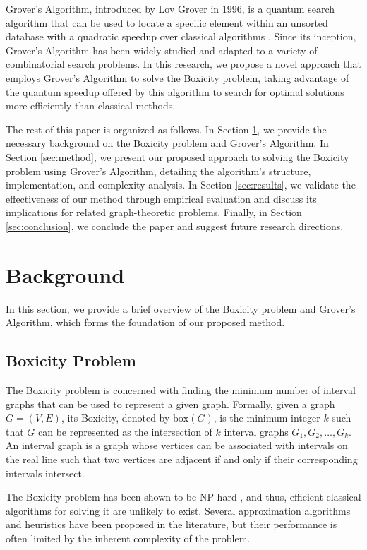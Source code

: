 Grover's Algorithm, introduced by Lov Grover in 1996, is a quantum search algorithm that can be used to locate a specific element within an unsorted database with a quadratic speedup over classical algorithms \cite{grover1996}. Since its inception, Grover's Algorithm has been widely studied and adapted to a variety of combinatorial search problems. In this research, we propose a novel approach that employs Grover's Algorithm to solve the Boxicity problem, taking advantage of the quantum speedup offered by this algorithm to search for optimal solutions more efficiently than classical methods.

The rest of this paper is organized as follows. In Section \ref{sec:background}, we provide the necessary background on the Boxicity problem and Grover's Algorithm. In Section \ref{sec:method}, we present our proposed approach to solving the Boxicity problem using Grover's Algorithm, detailing the algorithm's structure, implementation, and complexity analysis. In Section \ref{sec:results}, we validate the effectiveness of our method through empirical evaluation and discuss its implications for related graph-theoretic problems. Finally, in Section \ref{sec:conclusion}, we conclude the paper and suggest future research directions.

\section{Background} \label{sec:background}
In this section, we provide a brief overview of the Boxicity problem and Grover's Algorithm, which forms the foundation of our proposed method.

\subsection{Boxicity Problem}
The Boxicity problem is concerned with finding the minimum number of interval graphs that can be used to represent a given graph. Formally, given a graph $G=(V,E)$, its Boxicity, denoted by $\mathrm{box}(G)$, is the minimum integer $k$ such that $G$ can be represented as the intersection of $k$ interval graphs $G_1, G_2, \ldots, G_k$. An interval graph is a graph whose vertices can be associated with intervals on the real line such that two vertices are adjacent if and only if their corresponding intervals intersect.

The Boxicity problem has been shown to be NP-hard \cite{robertson1964}, and thus, efficient classical algorithms for solving it are unlikely to exist. Several approximation algorithms and heuristics have been proposed in the literature, but their performance is often limited by the inherent complexity of the problem.

